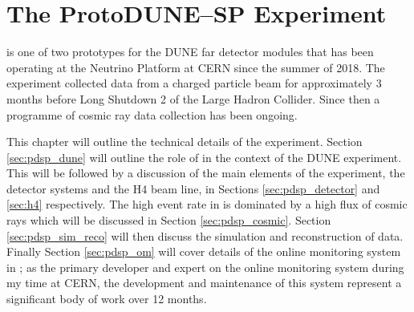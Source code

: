 \chapter{\label{ch:protodune}The ProtoDUNE--SP Experiment} 

\minitoc

%
% 


\protodune{} is one of two prototypes for the DUNE far detector modules that has
been operating at the Neutrino Platform at CERN since the summer of 2018. The
experiment collected data from a charged particle beam for approximately 3 
months before Long Shutdown 2 of the Large Hadron Collider. Since then a 
programme of cosmic ray data collection has been ongoing.

This chapter will outline the technical details of the \protodune{} experiment.
Section \ref{sec:pdsp_dune} will outline the role of \protodune{} in the context
of the DUNE experiment. This will be followed by a discussion of the main
elements of the experiment, the \protodune{} detector systems and the H4
beam line, in Sections \ref{sec:pdsp_detector} and \ref{sec:h4} respectively.
The high event rate in \protodune{} is dominated by a high flux of cosmic rays
which will be discussed in Section \ref{sec:pdsp_cosmic}. Section
\ref{sec:pdsp_sim_reco} will then discuss the simulation and reconstruction of 
\protodune{} data. Finally Section \ref{sec:pdsp_om} will cover details of the 
online monitoring system in \protodune{}; as the primary developer and expert 
on the \protodune{} online monitoring system during my time at CERN, the 
development and maintenance of this system represent a significant body of 
work over 12 months.  


